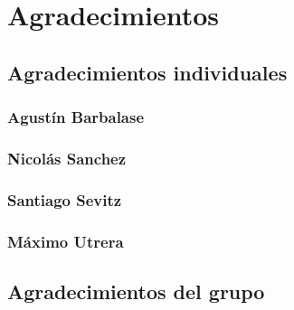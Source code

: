 \section{Agradecimientos}

\subsection{Agradecimientos individuales}

\subsubsection{Agustín Barbalase}


\subsubsection{Nicolás Sanchez}


\subsubsection{Santiago Sevitz}


\subsubsection{Máximo Utrera}


\subsection{Agradecimientos del grupo}

